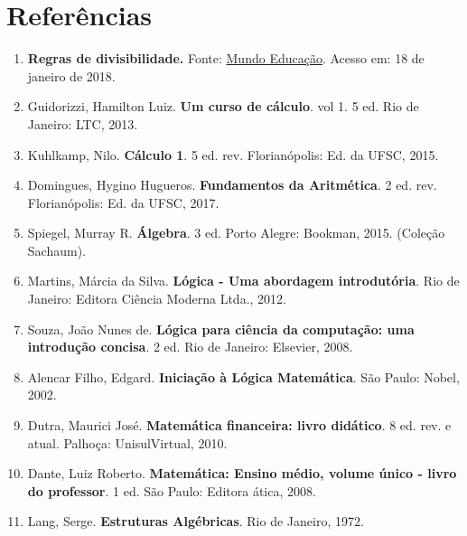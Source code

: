 \chapter*{Referências}

 \begin{enumerate}[(1)]
  \item \textbf{Regras de divisibilidade.} Fonte: \href{http://mundoeducacao.bol.uol.com.br/matematica/regras-divisibilidade.htm}{Mundo Educação}. Acesso em: 18 de janeiro de 2018.

  \item Guidorizzi, Hamilton Luiz. \textbf{Um curso de cálculo}. vol 1. 5 ed. Rio de Janeiro: LTC, 2013.

  \item Kuhlkamp, Nilo. \textbf{Cálculo 1}. 5 ed. rev. Florianópolis: Ed. da UFSC, 2015.
  
  \item Domingues, Hygino Hugueros. \textbf{Fundamentos da Aritmética}. 2 ed. rev. Florianópolis: Ed. da UFSC, 2017.

  \item Spiegel, Murray R. \textbf{Álgebra}. 3 ed. Porto Alegre: Bookman, 2015. (Coleção Sachaum).

  \item Martins, Márcia da Silva. \textbf{Lógica - Uma abordagem introdutória}. Rio de Janeiro: Editora Ciência Moderna Ltda., 2012.

  \item Souza, João Nunes de. \textbf{Lógica para ciência da computação: uma introdução concisa}. 2 ed. Rio de Janeiro: Elsevier, 2008.

  \item Alencar Filho, Edgard. \textbf{Iniciação à Lógica Matemática}. São Paulo: Nobel, 2002.

  \item Dutra, Maurici José. \textbf{Matemática financeira: livro didático}. 8 ed. rev. e atual. Palhoça: UnisulVirtual, 2010.

  \item Dante, Luiz Roberto. \textbf{Matemática: Ensino médio, volume único - livro do professor}. 1 ed. São Paulo: Editora ática, 2008.
  
  \item Lang, Serge. \textbf{Estruturas Algébricas}. Rio de Janeiro, 1972.

  \end{enumerate}
